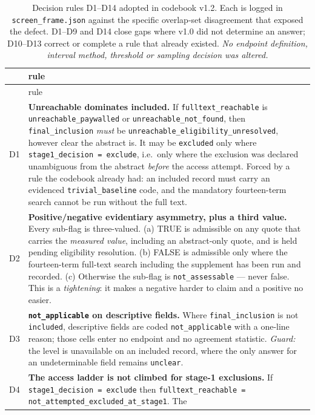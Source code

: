 \documentclass[11pt,a4paper]{article}
\begin{document}
{\small
\begin{longtable}{@{}lL{13.0cm}@{}}
\caption{Decision rules D1--D14 adopted in codebook v1.2. Each is logged in
\texttt{screen\_frame.json} against the specific overlap-set disagreement that
exposed the defect. D1--D9 and D14 close gaps where v1.0 did not determine an answer;
D10--D13 correct or complete a rule that already existed. \emph{No endpoint
definition, interval method, threshold or sampling decision was altered.}}
\label{tab:drules}\\
\toprule
& rule \\
\midrule
\endfirsthead
\toprule
& rule \\
\midrule
\endhead
\bottomrule
\endfoot
D1 & \textbf{Unreachable dominates included.} If \texttt{fulltext\_reachable} is
\texttt{unreachable\_paywalled} or \texttt{unreachable\_not\_found}, then
\texttt{final\_inclusion} \emph{must} be \texttt{unreachable\_eligibility\_unresolved},
however clear the abstract is. It may be \texttt{excluded} only where
\texttt{stage1\_decision = exclude}, i.e.\ only where the exclusion was declared
unambiguous from the abstract \emph{before} the access attempt. Forced by a rule the
codebook already had: an included record must carry an evidenced
\texttt{trivial\_baseline} code, and the mandatory fourteen-term search cannot be run
without the full text. \\
D2 & \textbf{Positive/negative evidentiary asymmetry, plus a third value.} Every
sub-flag is three-valued. (a) TRUE is admissible on any quote that carries the
\emph{measured value}, including an abstract-only quote, and is held pending
eligibility resolution. (b) FALSE is admissible only where the fourteen-term
full-text search including the supplement has been run and recorded. (c) Otherwise
the sub-flag is \texttt{not\_assessable} --- never false. This is a \emph{tightening}:
it makes a negative harder to claim and a positive no easier. \\
D3 & \textbf{\texttt{not\_applicable} on descriptive fields.} Where
\texttt{final\_inclusion} is not \texttt{included}, descriptive fields are coded
\texttt{not\_applicable} with a one-line reason; those cells enter no endpoint and no
agreement statistic. \emph{Guard:} the level is unavailable on an included record,
where the only answer for an undeterminable field remains \texttt{unclear}. \\
D4 & \textbf{The access ladder is not climbed for stage-1 exclusions.} If
\texttt{stage1\_decision = exclude} then
\texttt{fulltext\_reachable = not\_attempted\_excluded\_at\_stage1}. The

\end{longtable}}
\end{document}
